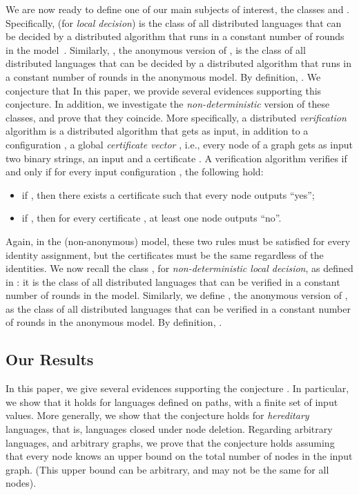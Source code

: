 \documentclass{llncs}
\begin{document}
We are now ready to define one of our main subjects of interest, the classes  and . Specifically,  (for \emph{local decision}) is the class of all distributed languages that can be decided by a  distributed algorithm that runs in a constant number of  rounds in the  model~\cite{FKP11}. Similarly, , the anonymous version of , is the class of all distributed languages that can be decided by a  distributed algorithm that runs in a constant number of rounds in the anonymous  model. By definition, . We conjecture that  In this paper, we provide several evidences supporting this conjecture. In addition, we investigate the \emph{non-deterministic} version of these classes, and prove that they coincide. More specifically, a distributed {\em verification} algorithm is a distributed algorithm  that gets as input, in addition to a configuration , a global {\em certificate vector} , i.e., every node  of a graph  gets as input two binary strings, an input  and a certificate . A verification algorithm  verifies  if and only if for every input configuration , the following hold: 
\begin{itemize}
\item if , then there exists a certificate  such that every node outputs ``yes''; 
\item if , then for every certificate , at least one node outputs ``no''.
\end{itemize}
Again, in the (non-anonymous)  model, these two rules must be satisfied for every identity assignment, but the certificates must be the same regardless of the identities.
We now recall the class , for \emph{non-deterministic local decision}, as defined in \cite{FKP11}: it is the class of all distributed languages that can be verified in a constant number of rounds in the  model. Similarly, we define , the anonymous version of , as the class of all distributed languages that can be verified in a constant number of rounds in the anonymous  model. By definition, . 

\subsection{Our Results}


In this paper, we give several evidences supporting the conjecture . In particular, we show that it holds for languages defined on paths, with a finite set of input values. More generally, we show that the conjecture holds for \emph{hereditary} languages, that is, languages closed under node deletion. Regarding arbitrary languages, and arbitrary graphs, we prove that the conjecture holds assuming that every node knows an  upper bound on the total number of nodes in the input graph. (This upper bound can be arbitrary, and may not be the same for all nodes). 
\end{document}

